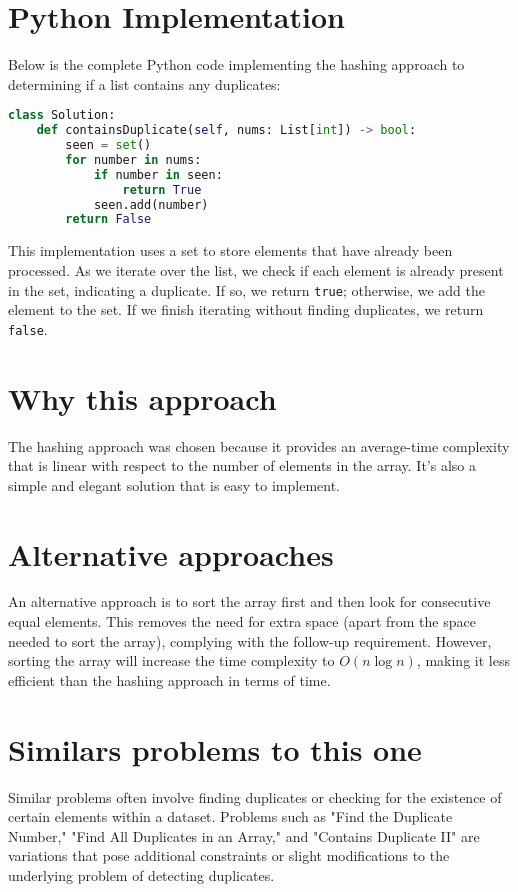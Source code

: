 \section*{Python Implementation}
Below is the complete Python code implementing the hashing approach to determining if a list contains any duplicates:

\begin{fullwidth}
\begin{lstlisting}[language=Python]
class Solution:
    def containsDuplicate(self, nums: List[int]) -> bool:
        seen = set()
        for number in nums:
            if number in seen:
                return True
            seen.add(number)
        return False
\end{lstlisting}

\end{fullwidth}

This implementation uses a set to store elements that have already been processed. As we iterate over the list, we check if each element is already present in the set, indicating a duplicate. If so, we return \texttt{true}; otherwise, we add the element to the set. If we finish iterating without finding duplicates, we return \texttt{false}.

\section*{Why this approach}
The hashing approach was chosen because it provides an average-time complexity that is linear with respect to the number of elements in the array. It's also a simple and elegant solution that is easy to implement.

\section*{Alternative approaches}
An alternative approach is to sort the array first and then look for consecutive equal elements. This removes the need for extra space (apart from the space needed to sort the array), complying with the follow-up requirement. However, sorting the array will increase the time complexity to \(O(n \log n)\), making it less efficient than the hashing approach in terms of time.

\section*{Similars problems to this one}
Similar problems often involve finding duplicates or checking for the existence of certain elements within a dataset. Problems such as "Find the Duplicate Number," "Find All Duplicates in an Array," and "Contains Duplicate II" are variations that pose additional constraints or slight modifications to the underlying problem of detecting duplicates.

